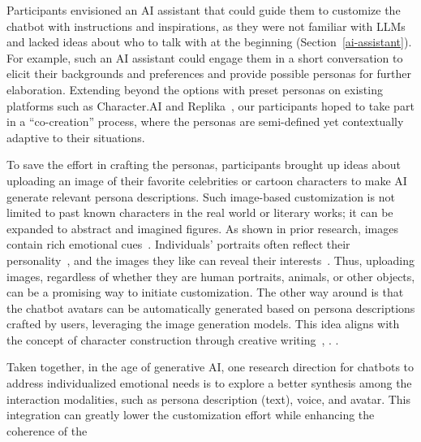 Participants envisioned an AI assistant that could guide them to customize the chatbot with instructions and inspirations, as they were not familiar with LLMs and lacked ideas about who to talk with at the beginning (Section~\ref{ai-assistant}).
For example, such an AI assistant could engage them in a short conversation to elicit their backgrounds and preferences and provide possible personas for further elaboration. 
Extending beyond the options with preset personas on existing platforms such as Character.AI and Replika~\cite{characterai, replika, Ha2024Clochat}, our participants hoped to take part in a ``co-creation'' process, where the personas are semi-defined yet contextually adaptive to their situations.

To save the effort in crafting the personas, participants brought up ideas about uploading an image of their favorite celebrities or cartoon characters to make AI generate relevant persona descriptions.
Such image-based customization is not limited to past known characters in the real world or literary works; it can be expanded to abstract and imagined figures. As shown in prior research, images contain rich emotional cues~\cite{WHITTY2018picture, segalin2017picture}. Individuals' portraits often reflect their personality~\cite{WHITTY2018picture}, and the images they like can reveal their interests~\cite{segalin2017picture}. Thus, uploading images, regardless of whether they are human portraits, animals, or other objects, can be a promising way to initiate customization.
The other way around is that the chatbot avatars can be automatically generated based on persona descriptions crafted by users, leveraging the image generation models. This idea aligns with the concept of character construction through creative writing~\cite{qin2024charactermeet}, . 
.

Taken together, in the age of generative AI, one research direction for chatbots to address individualized emotional needs is to explore a better synthesis among the interaction modalities, such as persona description (text), voice, and avatar. This integration can greatly lower the customization effort while enhancing the coherence of the 


